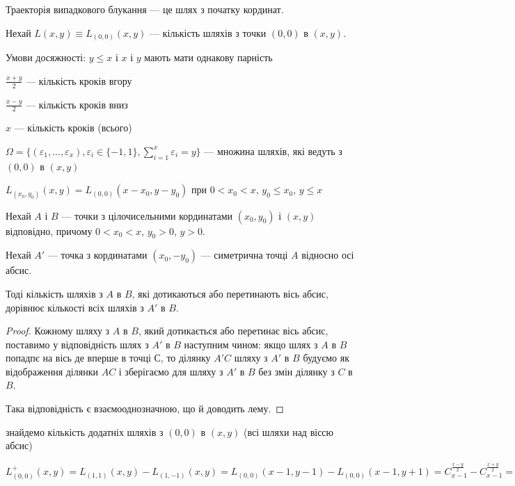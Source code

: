 Траекторія випадкового блукання --- це шлях з початку
кординат.

Нехай $L(x, y) \equiv L_{(0, 0)}(x,y)$ --- кількість шляхів з точки
$(0, 0)$ в $(x, y)$.

\beautifulImage

Умови досяжності: $y \leqslant x$ і $x$ і $y$ мають мати однакову парність

$\frac{x+y}{2}$ --- кількість кроків вгору

$\frac{x-y}{2}$ --- кількість кроків вниз

$x$ --- кількість кроків (всього)

$\Omega = \{ (\varepsilon_1, ..., \varepsilon_x),
\varepsilon_i \in \{-1, 1\},
\sum\limits_{i=1}^x \varepsilon_i = y \}$ --- множина шляхів,
які ведуть з $(0, 0)$ в $(x, y)$

\begin{remark}
    $L_{(x_0, y_0)}(x,y) = L_{(0, 0)}(x - x_0, y - y_0)$ при
    $0 < x_0 < x$, $y_0 \leqslant x_0$, $y \leqslant x$
\end{remark}

\begin{lemma}
    Нехай $A$ і $B$ --- точки з цілочисельними кординатами $(x_0, y_0)$ і $(x, y)$ відповідно,
    причому $0 < x_0 < x$, $y_0 > 0$, $y > 0$.

    \beautifulImage
    
    Нехай $A'$ --- точка з кординатами $(x_0, -y_0)$ --- симетрична точці $A$ відносно
    осі абсис.

    Тоді кількість шляхів з $A$ в $B$, які дотикаються або перетинають вісь 
    абсис, дорівнює кількості всіх шляхів з $A'$ в $B$.
\end{lemma}
\begin{proof}
    \beautifulImage

    Кожному шляху з $A$ в $B$, який дотикається або перетинає вісь абсис,
    поставимо у відповідність шлях з $A'$ в $B$ наступним чином:
    якщо шлях з $A$ в $B$ попадпє на вісь де вперше в точці С, то ділянку
    $A'C$ шляху з $A'$ в $B$ будуємо як відображення ділянки $AC$ і
    зберігаємо для шляху з $A'$ в $B$ без змін ділянку з $C$ в $B$.
    
    Така відповідність є взаємооднозначною, що й доводить лему.
\end{proof}

\begin{example}
    знайдемо кількість додатніх шляхів з $(0, 0)$ в
    $(x, y)$ (всі шляхи над віссю абсис)
    
    \beautifulImage
    
    $L_{(0,0)}^{+} (x, y)
    = L_{(1,1)} (x, y) - L_{(1,-1)} (x, y)
    = L_{(0,0)} (x-1, y-1) - L_{(0,0)} (x-1, y+1)
    = C_{x-1}^{\frac{x-y}{2}} - C_{x-1}^{\frac{x+y}{2}}
    = \frac{y}{x} \cdot L_{(0,0)} (x, y)
    = \frac{y}{x} \cdot C_{x}^{\frac{x+y}{2}}$
\end{example}

